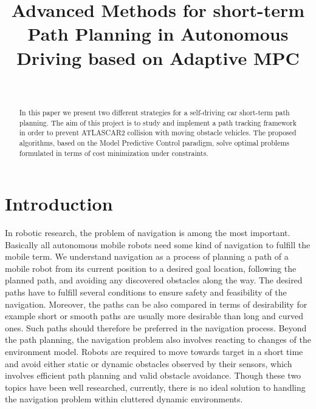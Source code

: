 \documentclass[conference, 11pt]{IEEEtran}
\title{Advanced Methods for short-term Path Planning in Autonomous Driving based on Adaptive MPC}
\author{\IEEEauthorblockN{Alberto Franco}\\
\IEEEauthorblockA{Department of Information Engineering\\
Università degli Studi di Padova\\ \href{mailto:alberto.franco.3@studenti.unipd.it}{alberto.franco.3@studenti.unipd.it}}}
\begin{document}
\maketitle
\begin{abstract}
	In this paper we present two different strategies for a self-driving car short-term path planning. The aim of this project is to study and implement a path tracking framework in order to prevent ATLASCAR2 collision with moving obstacle vehicles. The proposed algorithms, based on the Model Predictive Control paradigm, solve optimal problems formulated in terms of cost minimization under constraints.
\end{abstract}
\section{Introduction}
In robotic research, the problem of navigation is among the most important. Basically all autonomous mobile robots need some kind of navigation to fulfill the mobile term.
We understand navigation as a process of planning a path of a mobile robot from its current position to a desired goal location, following the planned path, and avoiding any discovered obstacles along the way. The desired paths have to
fulfill several conditions to ensure safety and feasibility of the navigation. Moreover, the paths can be also compared in terms of desirability for example short or smooth paths are usually more desirable than long and curved ones. Such paths should therefore be preferred in the navigation process. Beyond the path planning, the navigation problem also involves reacting to changes of the environment model. Robots are required to move towards target in a short time and avoid either static or dynamic obstacles observed by their sensors, which involves efficient path planning and valid obstacle avoidance. Though these two topics have been well researched, currently, there is no ideal solution to handling the navigation problem within cluttered dynamic environments.
\end{document}
